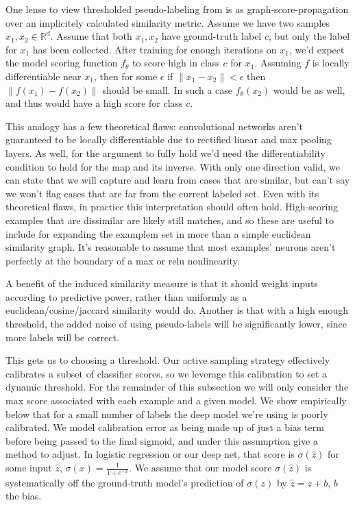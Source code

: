 \documentclass{article}
\begin{document}
One lense to view thresholded pseudo-labeling from is as graph-score-propagation over an implicitely calculated similarity metric.  Assume we have two samples $x_1,x_2 \in \mathbb{R}^d$.  Assume that both $x_1,x_2$ have ground-truth label $c$, but only the label for $x_1$ has been collected.  After training for enough iterations on $x_1$, we'd expect the model scoring function $f_{\theta}$ to score high in class $c$ for $x_1$.  Assuming $f$ is locally differentiable near $x_1$, then for some $\epsilon$ if $\|x_1-x_2\|<\epsilon$ then $\|f(x_1)-f(x_2)\|$ should be small.  In such a case $f_{\theta}(x_2)$ would be as well, and thus would have a high score for class $c$.  

This analogy has a few theoretical flaws: convolutional networks aren't guaranteed to be locally differentiable due to rectified linear and max pooling layers.  As well, for the argument to fully hold we'd need the differentiability condition to hold for the map and its inverse.  With only one direction valid, we can state that we will capture and learn from cases that are similar, but can't say we won't flag cases that are far from the current labeled set.  Even with its theoretical flaws, in practice this interpretation should often hold.  High-scoring examples that are dissimilar are likely still matches, and so these are useful to include for expanding the examplem set in more than a simple euclidean similarity graph.  It's reasonable to assume that most examples' neurons aren't perfectly at the boundary of a max or relu nonlinearity.  

A benefit of the induced similarity measure is that it should weight inputs according to predictive power, rather than uniformly as a euclidean/cosine/jaccard similarity would do.  Another is that with a high enough threshold, the added noise of using pseudo-labels will be significantly lower, since more labels will be correct. 

This gets us to choosing a threshold.  Our active sampling strategy effectively calibrates a subset of classifier scores, so we leverage this calibration to set a dynamic threshold.  For the remainder of this subsection we will only consider the max score associated with each example and a given model.  We show empirically below that for a small number of labels the deep model we're using is poorly calibrated.  We model calibration error as being made up of just a bias term before being passed to the final sigmoid, and under this assumption give a method to adjust.  In logistic regression or our deep net, that score is $\sigma(\hat{z})$ for some input $\hat{z}$, $\sigma(x)=\frac{1}{1+e^{-x}}$.  We assume that our model score $\sigma(\hat{z})$ is systematically off the ground-truth model's prediction of $\sigma(z)$ by $\hat{z}=z+b$, $b$ the bias.  
\end{document}
